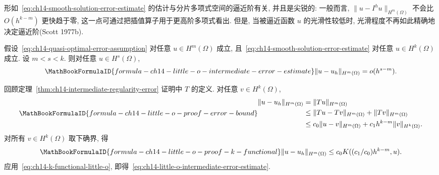 形如~\eqref{eq:ch14-smooth-solution-error-estimate} 的估计与分片多项式空间的逼近阶有关, 并且是尖锐的: 一般而言, $\|u-I^hu\|_{H^m(\Omega)}$ 不会比 $O(h^{k-m})$ 更快趋于零, 这一点可通过把插值算子用于更高阶多项式看出. 但是, 当被逼近函数 $u$ 的光滑性较低时, 光滑程度不再如此精确地决定逼近阶(Scott 1977b).

\begin{Theorem}
\label{thm:ch14-little-o-intermediate-error}
假设~\eqref{eq:ch14-quasi-optimal-error-assumption} 对任意 $u\in H^m(\Omega)$ 成立, 且~\eqref{eq:ch14-smooth-solution-error-estimate} 对任意 $u\in H^k(\Omega)$ 成立. 设 $m<s<k$. 则对任意 $u\in H^s(\Omega)$,
\begin{equation}
\MathBookFormulaID{formula-ch14-little-o-intermediate-error-estimate}
\label{eq:ch14-little-o-intermediate-error-estimate}
\|u-u_h\|_{H^m(\Omega)}=o(h^{s-m}).
\end{equation}
\end{Theorem}

\begin{Proof}
回顾定理~\ref{thm:ch14-intermediate-regularity-error} 证明中 $T$ 的定义. 对任意 $v\in H^k(\Omega)$,
\[
\MathBookFormulaID{formula-ch14-little-o-proof-error-bound}
\begin{aligned}
\|u-u_h\|_{H^m(\Omega)}
&=\|Tu\|_{H^m(\Omega)}\\
&\leq\|Tu-Tv\|_{H^m(\Omega)}+\|Tv\|_{H^m(\Omega)}\\
&\leq c_0\|u-v\|_{H^m(\Omega)}+c_1h^{k-m}\|v\|_{H^k(\Omega)}.
\end{aligned}
\]
对所有 $v\in H^k(\Omega)$ 取下确界, 得
\[
\MathBookFormulaID{formula-ch14-little-o-proof-k-functional}
\|u-u_h\|_{H^m(\Omega)}
\leq c_0K((c_1/c_0)h^{k-m},u).
\]
应用~\eqref{eq:ch14-k-functional-little-o}, 即得~\eqref{eq:ch14-little-o-intermediate-error-estimate}.
\end{Proof}

